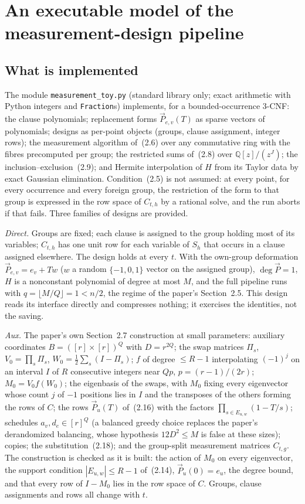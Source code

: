 \documentclass[11pt]{article}
\theoremstyle{definition}
\theoremstyle{remark}
\newcommand{\Qq}{\mathbb{Q}}
\begin{document}
\section{An executable model of the measurement-design pipeline}\label{sec:toy}

\subsection{What is implemented}

The module \texttt{measurement\_toy.py} (standard library only; exact arithmetic with Python integers and \texttt{Fraction}s) implements, for a bounded-occurrence 3-CNF: the clause polynomials; replacement forms $\vec P_{e,v}(T)$ as sparse vectors of polynomials; designs as per-point objects (groups, clause assignment, integer rows); the measurement algorithm of~(2.6) over any commutative ring with the fibres precomputed per group; the restricted sums of~(2.8) over $\Qq[z]/(z^J)$; the inclusion--exclusion~(2.9); and Hermite interpolation of $H$ from its Taylor data by exact Gaussian elimination. Condition~(2.5) is not assumed: at every point, for every occurrence and every foreign group, the restriction of the form to that group is expressed in the row space of $C_{t,h}$ by a rational solve, and the run aborts if that fails. Three families of designs are provided.

\emph{Direct.} Groups are fixed; each clause is assigned to the group holding most of its variables; $C_{t,h}$ has one unit row for each variable of $S_h$ that occurs in a clause assigned elsewhere. The design holds at every $t$. With the own-group deformation $\vec P_{e,v} = e_v + T w$ ($w$ a random $\{-1,0,1\}$ vector on the assigned group), $\deg \vec P = 1$, $H$ is a nonconstant polynomial of degree at most $M$, and the full pipeline runs with $q = \lfloor M/Q \rfloor = 1 < n/2$, the regime of the paper's Section~2.5. This design reads its interface directly and compresses nothing; it exercises the identities, not the saving.

\emph{Aux.} The paper's own Section~2.7 construction at small parameters: auxiliary coordinates $B = ([r] \times [r])^Q$ with $D = r^{2Q}$; the swap matrices $\Pi_s$, $V_0 = \prod_s \Pi_s$, $W_0 = \tfrac12 \sum_s (I - \Pi_s)$; $f$ of degree $\le R - 1$ interpolating $(-1)^j$ on an interval $I$ of $R$ consecutive integers near $Qp$, $p = (r-1)/(2r)$; $M_0 = V_0 f(W_0)$; the eigenbasis of the swaps, with $M_0$ fixing every eigenvector whose count $j$ of $-1$ positions lies in $I$ and the transposes of the others forming the rows of $C$; the rows $\vec P_u(T)$ of~(2.16) with the factors $\prod_{s \in E_{u,w}} (1 - T/s)$; schedules $a_v, d_e \in [r]^Q$ (a balanced greedy choice replaces the paper's derandomized balancing, whose hypothesis $12 D^2 \le M$ is false at these sizes); copies; the substitution~(2.18); and the group-split measurement matrices $C_{t,g}$. The construction is checked as it is built: the action of $M_0$ on every eigenvector, the support condition $|E_{u,w}| \le R - 1$ of~(2.14), $\vec P_u(0) = e_u$, the degree bound, and that every row of $I - M_0$ lies in the row space of $C$. Groups, clause assignments and rows all change with $t$.
\end{document}
